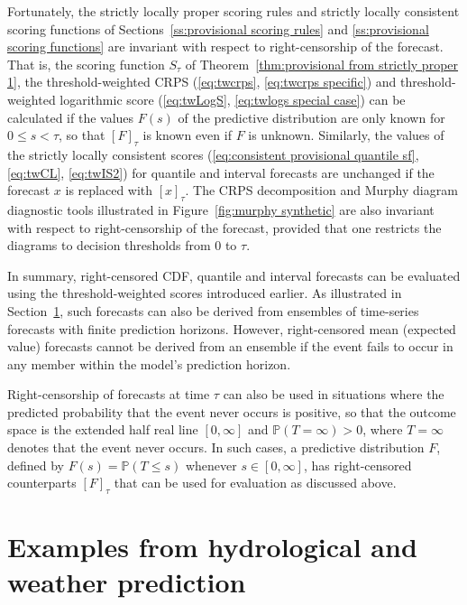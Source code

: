 \documentclass[10pt]{article} %
\theoremstyle{theorem}
\theoremstyle{definition}
\newcommand{\PPP}{\mathbb{P}}
\begin{document}
Fortunately, the strictly locally proper scoring rules and strictly locally consistent scoring functions of Sections~\ref{ss:provisional scoring rules} and \ref{ss:provisional scoring functions} are invariant with respect to right-censorship of the forecast. That is, the scoring function $S_\tau$ of Theorem~\ref{thm:provisional from strictly proper 1}, the threshold-weighted CRPS (\ref{eq:twcrps}, \ref{eq:twcrps specific}) and threshold-weighted logarithmic score (\ref{eq:twLogS}, \ref{eq:twlogs special case}) can be calculated if the values $F(s)$ of the predictive distribution are only known for $0 \leq s < \tau$, so that $[F]_\tau$ is known even if $F$ is unknown. Similarly, the values of the strictly locally consistent scores (\ref{eq:consistent provisional quantile sf}, \ref{eq:twCL}, \ref{eq:twIS2}) for quantile and interval forecasts are unchanged if the forecast $x$ is replaced with $[x]_\tau$. The CRPS decomposition and Murphy diagram diagnostic tools illustrated in Figure~\ref{fig:murphy synthetic} are also invariant with respect to right-censorship of the forecast, provided that one restricts the diagrams to decision thresholds from $0$ to $\tau$.

In summary, right-censored CDF, quantile and interval forecasts can be evaluated using the threshold-weighted scores introduced earlier. As illustrated in Section~\ref{s:real examples}, such forecasts can also be derived from ensembles of time-series forecasts with finite prediction horizons. However, right-censored mean (expected value) forecasts cannot be derived from an ensemble if the event fails to occur in any member within the model's prediction horizon.

Right-censorship of forecasts at time $\tau$ can also be used in situations where the predicted probability that the event never occurs is positive, so that the outcome space is the extended half real line $[0,\infty]$ and $\PPP(T=\infty)>0$, where $T=\infty$ denotes that the event never occurs. In such cases, a predictive distribution $F$, defined by $F(s)=\PPP(T\leq s)$ whenever $s\in[0,\infty]$, has right-censored counterparts $[F]_\tau$ that can be used for evaluation as discussed above.

\section{Examples from hydrological and weather prediction}\label{s:real examples}

\end{document}
